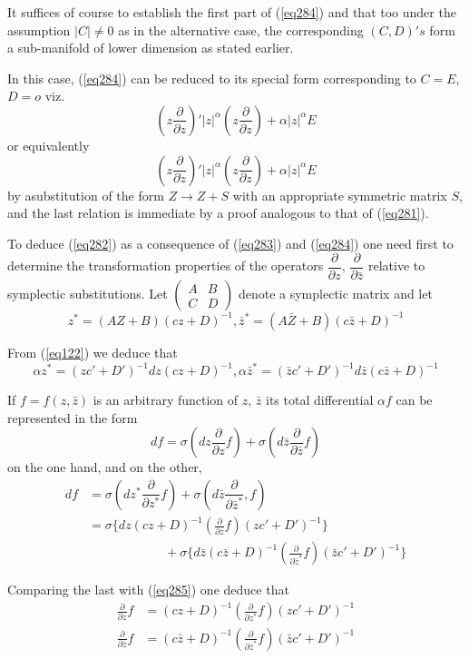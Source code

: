 It suffices of course to establish the first part of (\ref{eq284}) and that
too under the assumption $|C|\neq 0$ as in the alternative case, the
corresponding $(C,D)'s$ form a sub-manifold of lower
dimension as stated earlier. 

In this case, (\ref{eq284}) can be reduced to its special form corresponding
to $C=E$, $D=o$ \qquad viz. 
$$
(z \frac{\partial}{\partial z})' |z|^\alpha (z
\frac{\partial}{\partial z})+\alpha |z|^\alpha E 
$$
or equivalently
$$
(z \frac{\partial}{\partial z})' |z|^\alpha (z
\frac{\partial}{\partial z})+\alpha |z|^\alpha E 
$$
by a\pageoriginale substitution of the form $Z \to Z+S$ with an
appropriate symmetric matrix $S$, and the last relation is immediate
by a proof analogous to that of (\ref{eq281}).  

To deduce (\ref{eq282}) as a consequence of (\ref{eq283}) and
(\ref{eq284}) one need 
first to determine the transformation properties of the operators
$\dfrac{\partial}{\partial z}$, $\dfrac{\partial}{\partial \bar{z}}$
relative to symplectic substitutions. Let $\begin{pmatrix}A & B\\C &
  D \end {pmatrix}$ denote a symplectic matrix and let 
$$
z^*=(AZ+B)(cz+D)^{-1},\bar{z}^*=(A \bar{Z}+B)(c\bar{z}+D)^{-1} 
$$

From (\ref{eq122}) we deduce that
$$
\alpha z^* =(zc'+D')^{-1}dz(cz+D)^{-1}, \alpha \bar{z}^*
=(\bar{z}c'+D')^{-1}d\bar{z}(c\bar{z}+D)^{-1} 
$$

If $f=f(z,\bar{z})$ is an arbitrary function of $z$, $\bar{z}$ its total
differential $\alpha f$ can be represented in the form 
\begin{equation*}
df=\sigma (d z \frac{\partial}{\partial z}f)+\sigma (d
\bar{z}\frac{\partial}{\partial \bar{z}}f) \tag{285}\label{eq285}    
\end{equation*}
on the one hand, and on the other,
\begin{align*}
 df& =\sigma (dz^* \dfrac{\partial}{\partial z^*}f )+\sigma(d
  \bar{z}\dfrac{\partial}{\partial \bar{z}^*},f)\\ 
& =\sigma\bigg \{dz(cz+D)^{-1}(\frac{\partial}{\partial z}f)
  (zc'+D')^{-1}\bigg \}\\
& \qquad \qquad \qquad  +\sigma\bigg
  \{d\bar{z}(c\bar{z}+D)^{-1}(\frac{\partial}{\partial \bar{z}^*}f)
  (\bar{z}c'+D')^{-1}\bigg \} 
\end{align*}

Comparing the last with (\ref{eq285}) one deduce that
\begin{align*}
\frac{\partial}{\partial z}f & = (cz+D)^{-1}(\frac{\partial}{\partial
  z^*} f) (zc'+D')^{-1}\\ 
\frac{\partial}{\partial \bar{z}}f & =
(c\bar{z}+D)^{-1}(\frac{\partial}{\partial \bar{z}^*} f)
(\bar{z}c'+D')^{-1}
\end{align*}

